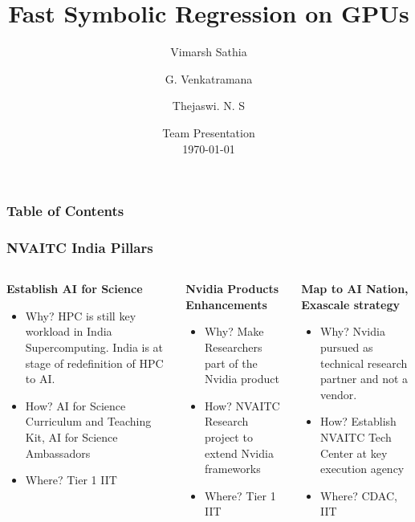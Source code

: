 \documentclass{beamer}
\title[GP on GPUs]{Fast Symbolic Regression on GPUs} %
\author[shortname]{Vimarsh Sathia \inst{1} \and G. Venkatramana \inst{2} \and Thejaswi. N. S \inst{2} } %
\institute[shortinst] %
{
\inst{1} Indian Institute of Technology Madras \and
\inst{2} Nvidia Corporation %
}
\date[\today]{Team Presentation \\ \today} %
\begin{document}
\begin{frame}
\titlepage %
\end{frame}

\begin{frame}
\frametitle{Table of Contents} %
\tableofcontents
\end{frame}


\begin{frame}
  \frametitle{NVAITC India Pillars}
  \begin{columns}[t,onlytextwidth]
    \begin{column}{0.3\textwidth}
      \textbf{Establish AI for Science}

      { \footnotesize
        \begin{itemize}
            \item Why? HPC is still key workload in India Supercomputing. India is at stage of redefinition of HPC to AI. 
            \item How? AI for Science Curriculum and Teaching Kit, AI for Science Ambassadors
            \item Where? Tier 1 IIT
        \end{itemize}
      }
    \end{column}
    
    \begin{column}{0.3\textwidth}
      \textbf{Nvidia Products Enhancements}
      { \footnotesize
      \begin{itemize}
        \item Why? Make Researchers part of the Nvidia product 
        \item How? NVAITC Research project to extend Nvidia frameworks
        \item Where? Tier 1 IIT
      \end{itemize}
      }
    \end{column}

    \begin{column}{0.3\textwidth}
      \textbf{Map to AI Nation, Exascale strategy}
      { \footnotesize
        \begin{itemize}
            \item Why? Nvidia pursued as technical research partner and not a vendor. 
            \item How? Establish NVAITC Tech Center at key execution agency
            \item Where? CDAC, IIT
        \end{itemize}
      }
    \end{column}
\end{columns}
\end{frame}
\end{document}
